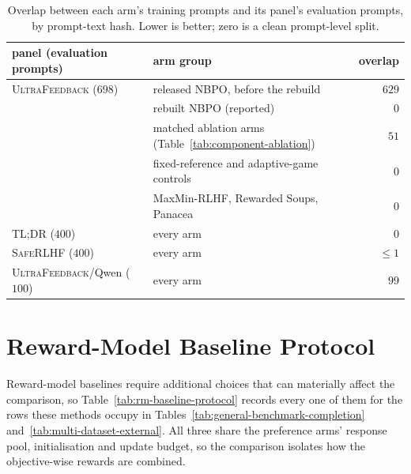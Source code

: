 \documentclass{article}
\theoremstyle{remark}
\theoremstyle{plain}
\newcommand{\NBPO}{\textsc{NBPO}}
\begin{document}
\begin{table}[t]
\centering\footnotesize
\setlength{\tabcolsep}{4.0pt}
\caption{Overlap between each arm's training prompts and its panel's evaluation prompts, by
prompt-text hash. Lower is better; zero is a clean prompt-level split.}
\label{tab:prompt-audit}
\begin{tabular}{llr}
\toprule
panel (evaluation prompts) & arm group & overlap\\
\midrule
\textsc{UltraFeedback} ($698$) & released \NBPO{}, before the rebuild & $629$\\
 & rebuilt \NBPO{} (reported) & $0$\\
 & matched ablation arms (Table~\ref{tab:component-ablation}) & $51$\\
 & fixed-reference and adaptive-game controls & $0$\\
 & MaxMin-RLHF, Rewarded Soups, Panacea & $0$\\
\midrule
\textsc{TL;DR} ($400$) & every arm & $0$\\
\textsc{SafeRLHF} ($400$) & every arm & $\le 1$\\
\midrule
\textsc{UltraFeedback}/Qwen ($100$) & every arm & $99$\\
\bottomrule
\end{tabular}
\end{table}

\section{Reward-Model Baseline Protocol}
\label{app:rm-baselines}
Reward-model baselines require additional choices that can materially affect the comparison, so Table~\ref{tab:rm-baseline-protocol} records every one of them for the rows these methods occupy in Tables~\ref{tab:general-benchmark-completion} and~\ref{tab:multi-dataset-external}. All three share the preference arms' response pool, initialisation and update budget, so the comparison isolates how the objective-wise rewards are combined.
\end{document}

